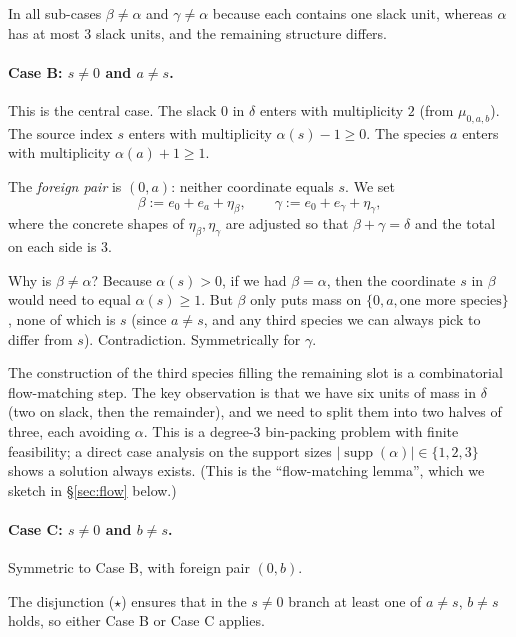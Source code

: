 \documentclass[11pt]{article}
\DeclareMathOperator{\supp}{supp}
\begin{document}
In all sub-cases $\beta \ne \alpha$ and $\gamma \ne \alpha$ because each
contains one slack unit, whereas $\alpha$ has at most $3$ slack units,
and the remaining structure differs.

\paragraph{Case B: $s \ne 0$ and $a \ne s$.}
This is the central case. The slack $0$ in $\delta$ enters with
multiplicity $2$ (from $\mu_{0,a,b}$). The source index $s$ enters with
multiplicity $\alpha(s) - 1 \ge 0$. The species $a$ enters with
multiplicity $\alpha(a) + 1 \ge 1$.

The \emph{foreign pair} is $(0, a)$: neither coordinate equals $s$. We
set
\[
   \beta := e_0 + e_a + \eta_\beta, \qquad \gamma := e_0 + e_\gamma + \eta_\gamma,
\]
where the concrete shapes of $\eta_\beta, \eta_\gamma$ are adjusted so
that $\beta + \gamma = \delta$ and the total on each side is $3$.

Why is $\beta \ne \alpha$? Because $\alpha(s) > 0$, if we had
$\beta = \alpha$, then the coordinate $s$ in $\beta$ would need to equal
$\alpha(s) \ge 1$. But $\beta$ only puts mass on $\{0, a, \text{one
more species}\}$, none of which is $s$ (since $a \ne s$, and any third
species we can always pick to differ from $s$). Contradiction.
Symmetrically for $\gamma$.

\medskip

The construction of the third species filling the remaining slot is a
combinatorial flow-matching step. The key observation is that we have
six units of mass in $\delta$ (two on slack, then the remainder), and
we need to split them into two halves of three, each avoiding $\alpha$.
This is a degree-3 bin-packing problem with finite feasibility; a direct
case analysis on the support sizes $|\supp(\alpha)| \in \{1, 2, 3\}$
shows a solution always exists. (This is the ``flow-matching lemma'',
which we sketch in \S\ref{sec:flow} below.)

\paragraph{Case C: $s \ne 0$ and $b \ne s$.}
Symmetric to Case B, with foreign pair $(0, b)$.

\medskip

The disjunction ($\star$) ensures that in the $s \ne 0$ branch at least
one of $a \ne s$, $b \ne s$ holds, so either Case B or Case C applies.
\end{document}
